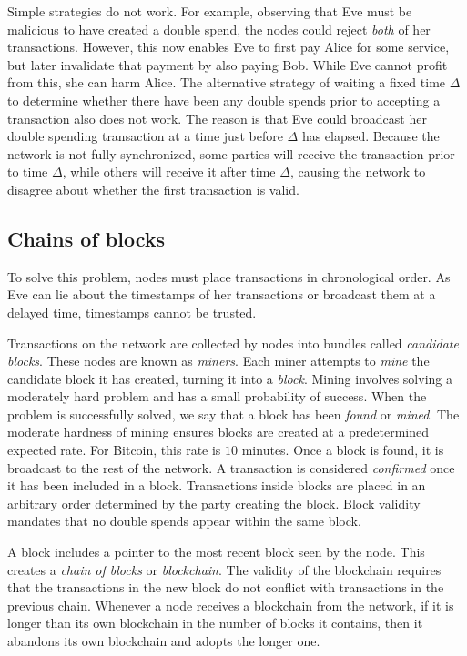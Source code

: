 Simple strategies do not work. For example, observing that Eve must be malicious
to have created a double spend, the nodes could reject \emph{both} of her
transactions. However, this now enables Eve to first pay Alice for some service,
but later invalidate that payment by also paying Bob. While Eve cannot profit
from this, she can harm Alice. The alternative strategy of waiting a fixed time
$\Delta$ to determine whether there have been any double spends prior to
accepting a transaction also does not work. The reason is that Eve could
broadcast her double spending transaction at a time just before $\Delta$ has
elapsed. Because the network is not fully synchronized, some parties will
receive the transaction prior to time $\Delta$, while others will receive it
after time $\Delta$, causing the network to disagree about whether the first
transaction is valid.

\subsection{Chains of blocks}
To solve this problem, nodes must place transactions in chronological order. As
Eve can lie about the timestamps of her transactions or broadcast them at a
delayed time, timestamps cannot be trusted.

Transactions on the network are collected by nodes into bundles called
\emph{candidate blocks}. These nodes are known as \emph{miners}. Each miner
attempts to \emph{mine} the candidate block it has created, turning it into a
\emph{block}. Mining involves solving a moderately hard problem and has a small
probability of success. When the problem is successfully solved, we say that a
block has been \emph{found} or \emph{mined}. The moderate hardness of mining
ensures blocks are created at a predetermined expected rate. For Bitcoin, this
rate is $10$ minutes. Once a block is found, it is broadcast to the rest of the
network. A transaction is considered \emph{confirmed} once it has been included
in a block. Transactions inside blocks are placed in an arbitrary order
determined by the party creating the block. Block validity mandates that no
double spends appear within the same block.

A block includes a pointer to the most recent block seen by the node. This
creates a \emph{chain of blocks} or \emph{blockchain}. The validity of the
blockchain requires that the transactions in the new block do not conflict with
transactions in the previous chain. Whenever a node receives a blockchain from
the network, if it is longer than its own blockchain in the number of blocks it
contains, then it abandons its own blockchain and adopts the longer one.

